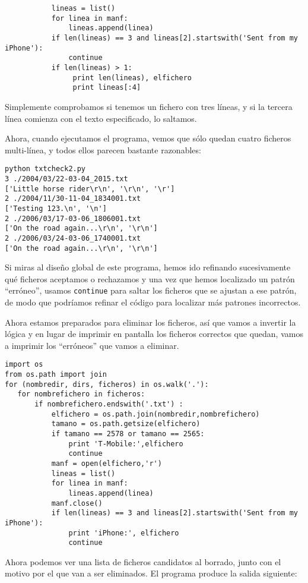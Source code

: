 \beforeverb
\begin{verbatim}
           lineas = list()
           for linea in manf:
               lineas.append(linea)
           if len(lineas) == 3 and lineas[2].startswith('Sent from my iPhone'):
               continue
           if len(lineas) > 1:
                print len(lineas), elfichero
                print lineas[:4]
\end{verbatim}
\afterverb
%
Simplemente comprobamos si tenemos un fichero con tres líneas, y si la tercera
línea comienza con el texto especificado, lo saltamos.

Ahora, cuando ejecutamos el programa, vemos que sólo quedan cuatro ficheros
multi-línea, y todos ellos parecen bastante razonables:

\beforeverb
\begin{verbatim}
python txtcheck2.py 
3 ./2004/03/22-03-04_2015.txt
['Little horse rider\r\n', '\r\n', '\r']
2 ./2004/11/30-11-04_1834001.txt
['Testing 123.\n', '\n']
2 ./2006/03/17-03-06_1806001.txt
['On the road again...\r\n', '\r\n']
2 ./2006/03/24-03-06_1740001.txt
['On the road again...\r\n', '\r\n']
\end{verbatim}
\afterverb
%
Si miras al diseño global de este programa,
hemos ido refinando sucesivamente qué ficheros aceptamos o rechazamos
y una vez que hemos localizado un patrón ``erróneo'', usamos
{\tt continue} para saltar los ficheros que se ajustan a ese patrón, de modo que podríamos
refinar el código para localizar más patrones incorrectos.

Ahora estamos preparados para eliminar los ficheros, así
que vamos a invertir la lógica y en lugar de imprimir en pantalla
los ficheros correctos que quedan, vamos a imprimir los
``erróneos'' que vamos a eliminar.

\beforeverb
\begin{verbatim}
import os
from os.path import join
for (nombredir, dirs, ficheros) in os.walk('.'):
   for nombrefichero in ficheros:
       if nombrefichero.endswith('.txt') :
           elfichero = os.path.join(nombredir,nombrefichero)
           tamano = os.path.getsize(elfichero)
           if tamano == 2578 or tamano == 2565:
               print 'T-Mobile:',elfichero
               continue
           manf = open(elfichero,'r')
           lineas = list()
           for linea in manf:
               lineas.append(linea)
           manf.close()
           if len(lineas) == 3 and lineas[2].startswith('Sent from my iPhone'):
               print 'iPhone:', elfichero
               continue
\end{verbatim}
\afterverb
%
Ahora podemos ver una lista de ficheros candidatos al
borrado, junto con el motivo por el que van a ser eliminados.
El programa produce la salida siguiente:

